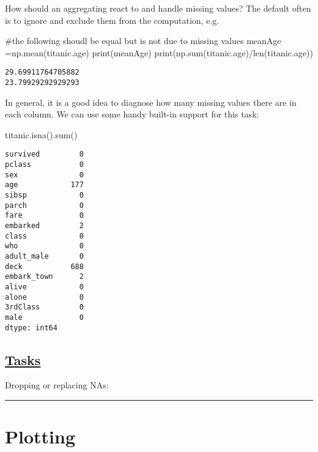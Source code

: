 \documentclass[
  letterpaper,
  DIV=11,
  numbers=noendperiod]{scrreprt}
\newenvironment{Shaded}{\begin{snugshade}}{\end{snugshade}}
\newcommand{\BuiltInTok}[1]{\textcolor[rgb]{0.00,0.23,0.31}{#1}}
\newcommand{\CommentTok}[1]{\textcolor[rgb]{0.37,0.37,0.37}{#1}}
\newcommand{\NormalTok}[1]{\textcolor[rgb]{0.00,0.23,0.31}{#1}}
\newcommand{\OperatorTok}[1]{\textcolor[rgb]{0.37,0.37,0.37}{#1}}
\begin{document}
How should an aggregating react to and handle missing values? The
default often is to ignore and exclude them from the computation, e.g.

\begin{Shaded}
\begin{Highlighting}[]
\CommentTok{\#the following shoudl be equal but is not due to missing values}
\NormalTok{meanAge }\OperatorTok{=}\NormalTok{np.mean(titanic.age)}
\BuiltInTok{print}\NormalTok{(meanAge)}
\BuiltInTok{print}\NormalTok{(np.}\BuiltInTok{sum}\NormalTok{(titanic.age)}\OperatorTok{/}\BuiltInTok{len}\NormalTok{(titanic.age))}
\end{Highlighting}
\end{Shaded}

\begin{verbatim}
29.69911764705882
23.79929292929293
\end{verbatim}

In general, it is a good idea to diagnose how many missing values there
are in each column. We can use some handy built-in support for this
task:

\begin{Shaded}
\begin{Highlighting}[]
\NormalTok{titanic.isna().}\BuiltInTok{sum}\NormalTok{()}
\end{Highlighting}
\end{Shaded}

\begin{verbatim}
survived         0
pclass           0
sex              0
age            177
sibsp            0
parch            0
fare             0
embarked         2
class            0
who              0
adult_male       0
deck           688
embark_town      2
alive            0
alone            0
3rdClass         0
male             0
dtype: int64
\end{verbatim}

\hypertarget{tasks-3}{%
\subsection{\texorpdfstring{\href{Lecture6_exercises.ipynb}{Tasks}}{Tasks}}\label{tasks-3}}

Dropping or replacing NAs:

\begin{center}\rule{0.5\linewidth}{0.5pt}\end{center}

\hypertarget{plotting-1}{%
\section{Plotting}\label{plotting-1}}
\end{document}
